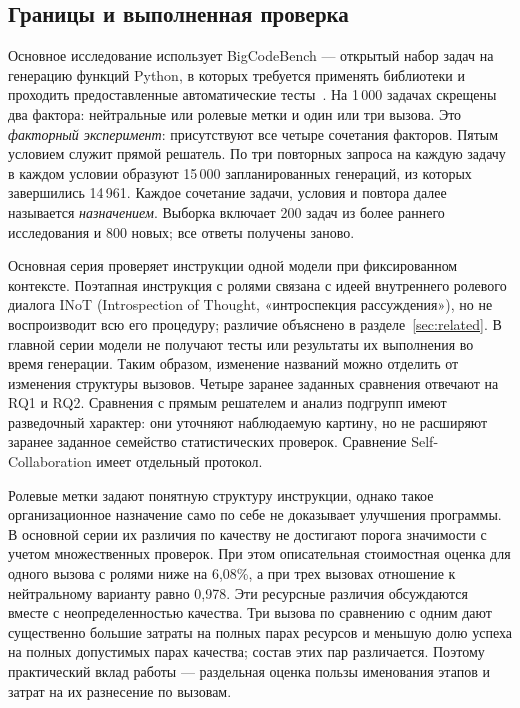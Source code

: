 \subsection{Границы и выполненная проверка}
Основное исследование использует BigCodeBench --- открытый набор задач на генерацию функций Python, в которых требуется применять библиотеки и проходить предоставленные автоматические тесты~\cite{zhuo2024bigcodebench}. На 1\,000 задачах скрещены два фактора: нейтральные или ролевые метки и один или три вызова. Это \emph{факторный эксперимент}: присутствуют все четыре сочетания факторов. Пятым условием служит прямой решатель. По три повторных запроса на каждую задачу в каждом условии образуют 15\,000 запланированных генераций, из которых завершились 14\,961. Каждое сочетание задачи, условия и повтора далее называется \emph{назначением}. Выборка включает 200 задач из более раннего исследования и 800 новых; все ответы получены заново.

Основная серия проверяет инструкции одной модели при фиксированном контексте. Поэтапная инструкция с ролями связана с идеей внутреннего ролевого диалога INoT (Introspection of Thought, «интроспекция рассуждения»), но не воспроизводит всю его процедуру; различие объяснено в разделе~\ref{sec:related}. В главной серии модели не получают тесты или результаты их выполнения во время генерации. Таким образом, изменение названий можно отделить от изменения структуры вызовов. Четыре заранее заданных сравнения отвечают на RQ1 и RQ2. Сравнения с прямым решателем и анализ подгрупп имеют разведочный характер: они уточняют наблюдаемую картину, но не расширяют заранее заданное семейство статистических проверок. Сравнение Self-Collaboration имеет отдельный протокол.

Ролевые метки задают понятную структуру инструкции, однако такое организационное назначение само по себе не доказывает улучшения программы. В основной серии их различия по качеству не достигают порога значимости с учетом множественных проверок. При этом описательная стоимостная оценка для одного вызова с ролями ниже на 6,08\%, а при трех вызовах отношение к нейтральному варианту равно 0,978. Эти ресурсные различия обсуждаются вместе с неопределенностью качества. Три вызова по сравнению с одним дают существенно большие затраты на полных парах ресурсов и меньшую долю успеха на полных допустимых парах качества; состав этих пар различается. Поэтому практический вклад работы --- раздельная оценка пользы именования этапов и затрат на их разнесение по вызовам.

\FloatBarrier
